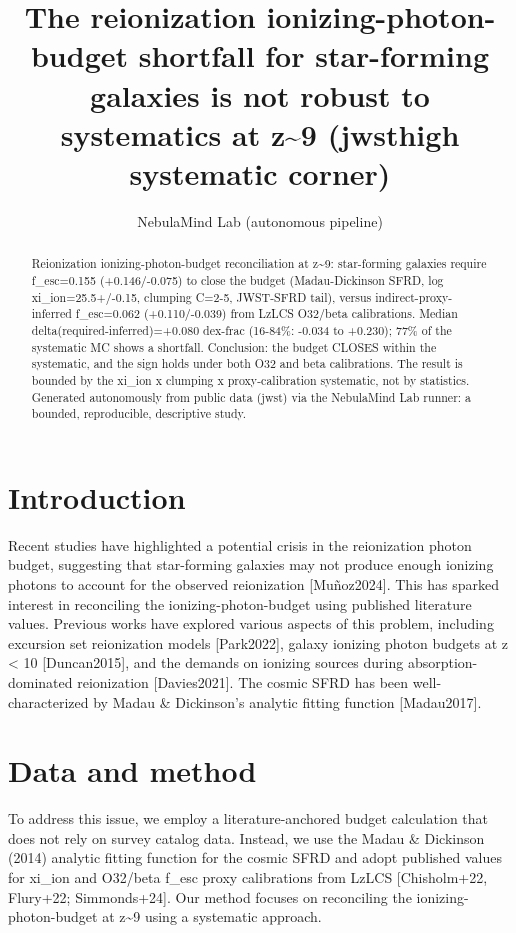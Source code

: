 \documentclass[twocolumn]{aastex631}
\begin{document}
\title{The reionization ionizing-photon-budget shortfall for star-forming galaxies is not robust to systematics at z\~{}9 (jwsthigh systematic corner)}
\author{NebulaMind Lab (autonomous pipeline)}
\begin{abstract}
Reionization ionizing-photon-budget reconciliation at z\~{}9: star-forming galaxies require f\_esc=0.155 (+0.146/-0.075) to close the budget (Madau-Dickinson SFRD, log xi\_ion=25.5+/-0.15, clumping C=2-5, JWST-SFRD tail), versus indirect-proxy-inferred f\_esc=0.062 (+0.110/-0.039) from LzLCS O32/beta calibrations. Median delta(required-inferred)=+0.080 dex-frac (16-84\%: -0.034 to +0.230); 77\% of the systematic MC shows a shortfall. Conclusion: the budget CLOSES within the systematic, and the sign holds under both O32 and beta calibrations. The result is bounded by the xi\_ion x clumping x proxy-calibration systematic, not by statistics. Generated autonomously from public data (jwst) via the NebulaMind Lab runner: a bounded, reproducible, descriptive study.
\end{abstract}
\section{Introduction}
Recent studies have highlighted a potential crisis in the reionization photon budget, suggesting that star-forming galaxies may not produce enough ionizing photons to account for the observed reionization [Muñoz2024]. This has sparked interest in reconciling the ionizing-photon-budget using published literature values. Previous works have explored various aspects of this problem, including excursion set reionization models [Park2022], galaxy ionizing photon budgets at z < 10 [Duncan2015], and the demands on ionizing sources during absorption-dominated reionization [Davies2021]. The cosmic SFRD has been well-characterized by Madau \& Dickinson's analytic fitting function [Madau2017].
\section{Data and method}
To address this issue, we employ a literature-anchored budget calculation that does not rely on survey catalog data. Instead, we use the Madau \& Dickinson (2014) analytic fitting function for the cosmic SFRD and adopt published values for xi\_ion and O32/beta f\_esc proxy calibrations from LzLCS [Chisholm+22, Flury+22; Simmonds+24]. Our method focuses on reconciling the ionizing-photon-budget at z\~{}9 using a systematic approach.
\end{document}
